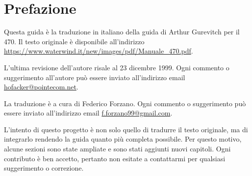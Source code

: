 \chapter{Prefazione}
\label{ch:Prefazione}
Questa guida è la traduzione in italiano della guida di Arthur Gurevitch per il
470. Il testo originale è disponibile all'indirizzo
\url{https://www.waterwind.it/new/images/pdf/Manuale_470.pdf}.

L'ultima revisione dell'autore risale al 23 dicembre 1999. Ogni commento o
suggerimento all'autore può essere inviato all'indirizzo email
\url{hofacker@pointecom.net}.

La traduzione è a cura di Federico Forzano. Ogni commento o suggerimento può
essere inviato all'indirizzo email \url{f.forzano99@gmail.com}.

L'intento di questo progetto è non solo quello di tradurre il testo originale,
ma di integrarlo rendendo la guida quanto più completa possibile. Per
questo motivo, alcune sezioni sono state ampliate e sono stati aggiunti nuovi
capitoli. Ogni contributo è ben accetto, pertanto non esitate a contattarmi
per qualsiasi suggerimento o correzione.